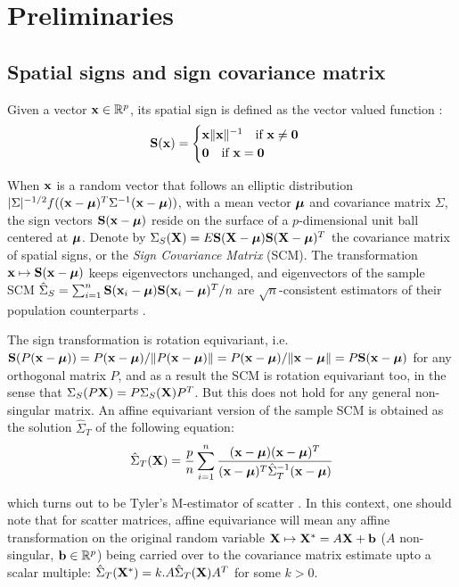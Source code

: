 \documentclass[fleqn,12pt]{article}
\begin{document}
\section{Preliminaries}
\subsection{Spatial signs and sign covariance matrix}
Given a vector ${\bf{x}} \in \mathbb{R}^p$, its spatial sign is defined as the vector valued function \citep{locantore99}:
$$ {\mathbf{S}}({\bf{x}}) = \begin{cases} {\bf{x}}\| {\bf{x}} \|^{-1} \quad \mbox{if }{\bf{x}} \neq \bf0\\
\bf0 \quad \mbox{if }{\bf{x}} = \bf0 \end{cases} $$

When ${\bf{x}}$ is a random vector that follows an elliptic distribution $|\Sigma|^{-1/2} f(({\bf{x}} - {\boldsymbol{\mu}})^T \Sigma^{-1} ({\bf{x}} - {\boldsymbol{\mu}}))$, with a mean vector ${\boldsymbol{\mu}}$ and covariance matrix $\Sigma$, the sign vectors ${\mathbf{S}}({\bf{x}} - {\boldsymbol{\mu}})$ reside on the surface of a $p$-dimensional unit ball centered at ${\boldsymbol{\mu}}$. Denote by $\Sigma_S({\mathbf{X}}) = E{\mathbf{S}} ({\mathbf{X}} - {\boldsymbol{\mu}}){\mathbf{S}} ({\mathbf{X}} - {\boldsymbol{\mu}})^T$ the covariance matrix of spatial signs, or the \textit{Sign Covariance Matrix} (SCM). The transformation ${\bf{x}} \mapsto {\mathbf{S}}({\bf{x}} - {\boldsymbol{\mu}})$ keeps eigenvectors unchanged, and eigenvectors of the sample SCM $ \hat \Sigma_S = \sum_{i=1}^n {\mathbf{S}} ({\bf{x}}_i - {\boldsymbol{\mu}}){\mathbf{S}} ({\bf{x}}_i - {\boldsymbol{\mu}})^T/n $ are $\sqrt n$-consistent estimators of their population counterparts \citep{taskinen12}.

The sign transformation is rotation equivariant, i.e. $ {\mathbf{S}}(P ({\bf{x}} - {\boldsymbol{\mu}})) = P({\bf{x}} - {\boldsymbol{\mu}})/\| P ({\bf{x}} - {\boldsymbol{\mu}})\| = P({\bf{x}} - {\boldsymbol{\mu}})/\|{\bf{x}} - {\boldsymbol{\mu}}\| = P {\mathbf{S}}({\bf{x}} - {\boldsymbol{\mu}})$ for any orthogonal matrix $P$, and as a result the SCM is rotation equivariant too, in the sense that $\Sigma_S(P{\mathbf{X}}) = P \Sigma_S({\mathbf{X}}) P^T$. But this does not hold for any general non-singular matrix. An affine equivariant version of the sample SCM is obtained as the solution $\hat \Sigma_T$ of the following equation:
$$ \hat \Sigma_T({\mathbf{X}}) = \frac{p}{n} \sum_{i=1}^n \frac{({\bf{x}} - {\boldsymbol{\mu}})({\bf{x}} - {\boldsymbol{\mu}})^T}{({\bf{x}} - {\boldsymbol{\mu}})^T \hat\Sigma_T^{-1} ({\bf{x}} - {\boldsymbol{\mu}})} $$

which turns out to be Tyler's M-estimator of scatter \citep{tyler87}. In this context, one should note that for scatter matrices, affine equivariance will mean any affine transformation on the original random variable ${\mathbf{X}} \mapsto {\mathbf{X}}^* = A{\mathbf{X}} + {\bf{b}}$ ($A$ non-singular, ${\bf{b}} \in \mathbb{R}^p$) being carried over to the covariance matrix estimate upto a scalar multiple: $\hat\Sigma_T({\mathbf{X}}^*) = k. A \hat\Sigma_T({\mathbf{X}}) A^T$ for some $k>0$.
\end{document}
